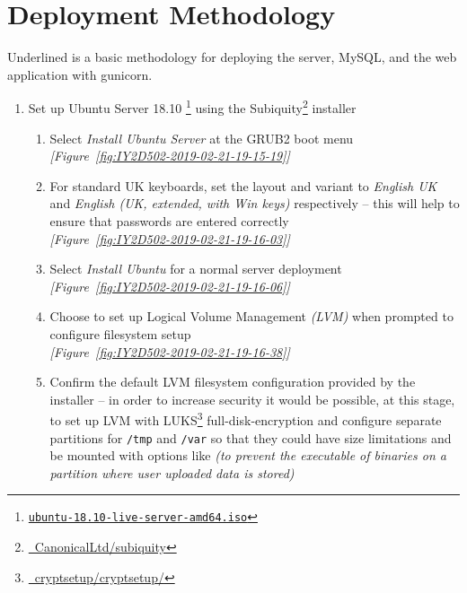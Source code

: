 \section{Deployment Methodology}
Underlined is a basic methodology for deploying the server, MySQL, and the web application with gunicorn.

\begin{enumerate}[leftmargin=0em,label=\protect\listlabelcircle{\arabic*}]
  \item Set up Ubuntu Server 18.10 \footnote{\href{http://releases.ubuntu.com/18.10/ubuntu-18.10-live-server-amd64.iso}{\texttt{ubuntu-18.10-live-server-amd64.iso}}} using the Subiquity\footnote{\href{https://github.com/CanonicalLtd/subiquity}{\faGithub\ CanonicalLtd/subiquity}} installer
    \begin{enumerate}[label=\Roman*~\textcolor{light-gray}{|}]
      \item Select \textit{Install Ubuntu Server} at the GRUB2 boot menu\\
      \textcolor{deep-gray}{\textit{[Figure~\ref{fig:IY2D502-2019-02-21-19-15-19}]}}
      \item For standard UK keyboards, set the layout and variant to \textit{English {UK}} and \textit{English (UK, extended, with Win keys)} respectively -- this will help to ensure that passwords are entered correctly\\
      \textcolor{deep-gray}{\textit{[Figure~\ref{fig:IY2D502-2019-02-21-19-16-03}]}}
      \item Select \textit{Install Ubuntu} for a normal server deployment\\
      \textcolor{deep-gray}{\textit{[Figure~\ref{fig:IY2D502-2019-02-21-19-16-06}]}}
      \item Choose to set up Logical Volume Management \textit{(LVM)} when prompted to configure filesystem setup\\
      \textcolor{deep-gray}{\textit{[Figure~\ref{fig:IY2D502-2019-02-21-19-16-38}]}}
      \item Confirm the default LVM filesystem configuration provided by the installer -- in order to increase security it would be possible, at this stage, to set up LVM with LUKS\footnote{\href{https://gitlab.com/cryptsetup/cryptsetup/}{\faGitlab\ cryptsetup/cryptsetup/}} full-disk-encryption and configure separate partitions for \texttt{/tmp} and \texttt{/var} so that they could have size limitations and be mounted with options like  \textit{(to prevent the executable of binaries on a partition where user uploaded data is stored)}\\

\end{enumerate}
\end{enumerate}
